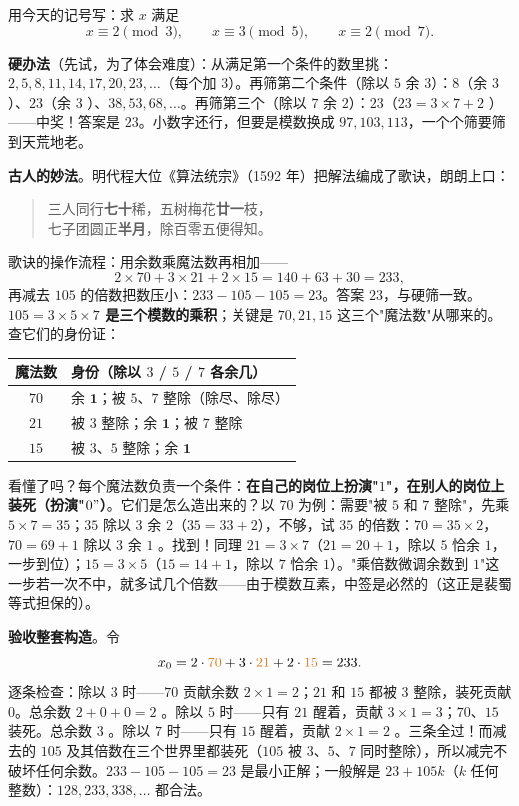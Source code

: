 用今天的记号写：求 $x$ 满足
\[
x \equiv 2 \pmod 3, \qquad x \equiv 3 \pmod 5, \qquad x \equiv 2 \pmod 7 .
\]

\textbf{硬办法}（先试，为了体会难度）：从满足第一个条件的数里挑：$2, 5, 8, 11, 14, 17, 20, 23, \dots$（每个加 $3$）。再筛第二个条件（除以 $5$ 余 $3$）：$8$（余 $3$ \checkmark）、$23$（余 $3$ \checkmark）、$38, 53, 68, \dots$。再筛第三个（除以 $7$ 余 $2$）：$23$（$23 = 3\times7+2$ \checkmark）——中奖！答案是 $23$。小数字还行，但要是模数换成 $97, 103, 113$，一个个筛要筛到天荒地老。

\textbf{古人的妙法}。明代程大位《算法统宗》（1592 年）把解法编成了歌诀，朗朗上口：

\begin{quote}\centering
三人同行\textbf{七十}稀，五树梅花\textbf{廿一}枝，\\
七子团圆正\textbf{半月}，除百零五便得知。
\end{quote}

歌诀的操作流程：用余数乘魔法数再相加——
\[
2\times70 + 3\times21 + 2\times15 = 140 + 63 + 30 = 233,
\]
再减去 $105$ 的倍数把数压小：$233 - 105 - 105 = 23$。答案 $23$，与硬筛一致。\textbf{$105 = 3\times5\times7$ 是三个模数的乘积}；关键是 $70, 21, 15$ 这三个"魔法数"从哪来的。查它们的身份证：

\begin{center}
\begin{tabular}{cl}
\toprule
魔法数 & 身份（除以 $3$ / $5$ / $7$ 各余几） \\
\midrule
$70$ & 余 $\mathbf{1}$；被 $5$、$7$ 整除（除尽、除尽） \\
$21$ & 被 $3$ 整除；余 $\mathbf{1}$；被 $7$ 整除 \\
$15$ & 被 $3$、$5$ 整除；余 $\mathbf{1}$ \\
\bottomrule
\end{tabular}
\end{center}

看懂了吗？每个魔法数负责一个条件：\textbf{在自己的岗位上扮演"$1$"，在别人的岗位上装死（扮演"$0"$）}。它们是怎么造出来的？以 $70$ 为例：需要"被 $5$ 和 $7$ 整除"，先乘 $5\times7 = 35$；$35$ 除以 $3$ 余 $2$（$35 = 33 + 2$），不够，试 $35$ 的倍数：$70 = 35\times2$，$70 = 69 + 1$ 除以 $3$ 余 $1$ \checkmark。找到！同理 $21 = 3\times7$（$21 = 20+1$，除以 $5$ 恰余 $1$，一步到位）；$15 = 3\times 5$（$15 = 14+1$，除以 $7$ 恰余 $1$）。"乘倍数微调余数到 $1$"这一步若一次不中，就多试几个倍数——由于模数互素，中签是必然的（这正是裴蜀等式担保的）。

\textbf{验收整套构造}。令
\[
x_0 = 2\cdot\textcolor{cheng}{70} + 3\cdot\textcolor{cheng}{21} + 2\cdot\textcolor{cheng}{15} = 233 .
\]
逐条检查：除以 $3$ 时——$70$ 贡献余数 $2\times1 = 2$；$21$ 和 $15$ 都被 $3$ 整除，装死贡献 $0$。总余数 $2 + 0 + 0 = 2$ \checkmark。除以 $5$ 时——只有 $21$ 醒着，贡献 $3\times1 = 3$；$70$、$15$ 装死。总余数 $3$ \checkmark。除以 $7$ 时——只有 $15$ 醒着，贡献 $2\times1 = 2$ \checkmark。三条全过！而减去的 $105$ 及其倍数在三个世界里都装死（$105$ 被 $3$、$5$、$7$ 同时整除），所以减完不破坏任何余数。$233 - 105 - 105 = 23$ 是最小正解；一般解是 $23 + 105k$（$k$ 任何整数）：$128, 233, 338, \dots$ 都合法。

